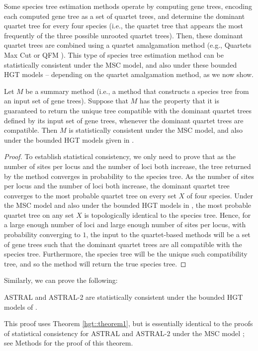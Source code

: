 Some  species tree estimation methods 
operate by computing gene trees, encoding each computed
gene tree as a set of quartet trees, and determine the
dominant quartet tree for every four species (i.e., the
quartet tree that appears the most frequently of the 
three possible unrooted quartet trees).
Then, these 
dominant quartet trees are combined using
a quartet amalgamation method
(e.g., Quartets Max Cut \cite{qmc} or QFM \cite{reaz2014accurate}).
This type of species tree estimation method 
can be statistically consistent under
the MSC model, and also under these bounded HGT models --
depending on the quartet amalgamation method, as we now show.
\begin{theorem}
\label{hgt::thm:astral-stat-hgt}
Let $M$ be a summary method  (i.e., a method that
constructs a species tree from an input set of gene trees).
Suppose that $M$ has the property that
it is guaranteed to return the unique tree
compatible with the dominant quartet trees defined
by its input set of gene trees, whenever
the dominant quartet trees are compatible.
Then $M$ is
statistically consistent under the 
MSC model, and also 
under the bounded HGT models 
given in \cite{RochSnir}.
\end{theorem}
\begin{proof}
To establish statistical consistency, we only need to
prove that as the number of sites per locus and the number of loci
both increase, the tree returned by the method converges
in probability
to the species tree. 
As the number of sites per locus and the number of
loci both increase, the dominant quartet tree converges to the
most probable quartet tree on every set $X$ of four species. 
Under the MSC model and also
under the bounded HGT models in \cite{RochSnir},
the most probable quartet tree on any set $X$ is
topologically identical to the species tree.
Hence, for a large enough number of loci and large enough
number of sites per locus, with probability converging to $1$, the
input to the quartet-based methods 
will be a set of gene trees such that the dominant
quartet trees are all compatible with the species tree.
Furthermore, the species tree will be the
unique such compatibility tree, and so
the method will return the true species tree.
\end{proof}


Similarly, we can prove the following:
\begin{theorem}
ASTRAL and ASTRAL-2  are statistically consistent under the bounded
HGT models of \cite{RochSnir}. 
\label{hgt::theorem-corollary}
\end{theorem}
This proof uses Theorem \ref{hgt::theorem1}, 
but is essentially identical to the proofs of
statistical consistency for ASTRAL and ASTRAL-2 under
the MSC model \cite{ASTRAL2}; see Methods for
the proof of this theorem.


